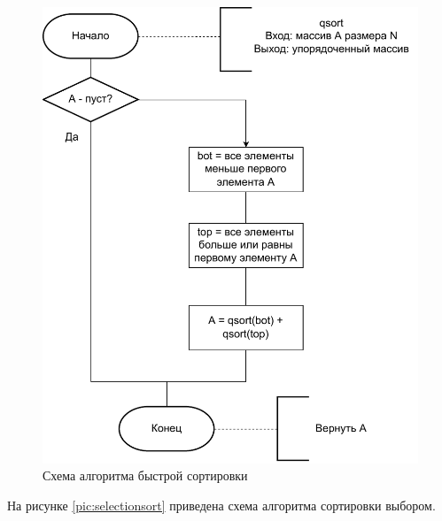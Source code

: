 \begin{figure}[H]
	\centering
	\includegraphics[scale=1]{assets/quicksort.pdf}
	\caption{Схема алгоритма быстрой сортировки}
	\label{pic:quicksort}
\end{figure}

\newpage

На рисунке \ref{pic:selectionsort} приведена схема алгоритма сортировки выбором.

